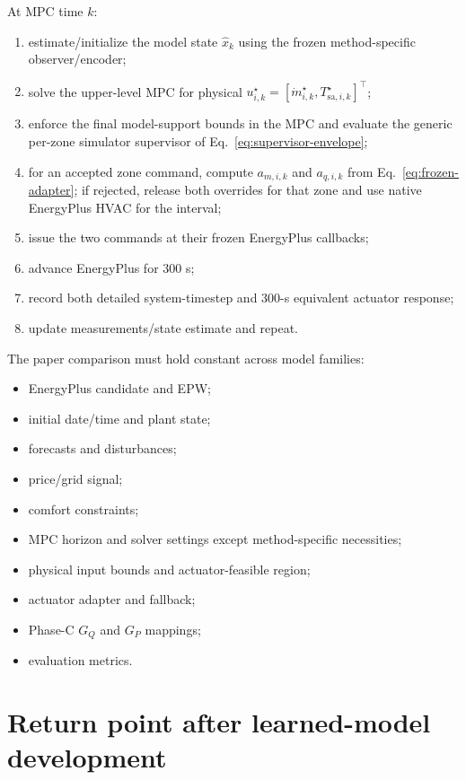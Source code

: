 \documentclass[11pt]{article}
\newcommand{\mdot}{\dot m}
\begin{document}
At MPC time $k$:
\begin{enumerate}[leftmargin=2em]
\item estimate/initialize the model state $\hat x_k$ using the frozen
method-specific observer/encoder;
\item solve the upper-level MPC for physical
$u_{i,k}^\star=[\mdot_{i,k}^\star,T_{\mathrm{sa},i,k}^\star]^\top$;
\item enforce the final model-support bounds in the MPC and evaluate the
generic per-zone simulator supervisor of Eq.~\eqref{eq:supervisor-envelope};
\item for an accepted zone command, compute $a_{m,i,k}$ and $a_{q,i,k}$ from
Eq.~\eqref{eq:frozen-adapter}; if rejected, release both overrides for that
zone and use native EnergyPlus HVAC for the interval;
\item issue the two commands at their frozen EnergyPlus callbacks;
\item advance EnergyPlus for 300 s;
\item record both detailed system-timestep and 300-s equivalent actuator
response;
\item update measurements/state estimate and repeat.
\end{enumerate}

The paper comparison must hold constant across model families:
\begin{itemize}[leftmargin=2em]
\item EnergyPlus candidate and EPW;
\item initial date/time and plant state;
\item forecasts and disturbances;
\item price/grid signal;
\item comfort constraints;
\item MPC horizon and solver settings except method-specific necessities;
\item physical input bounds and actuator-feasible region;
\item actuator adapter and fallback;
\item Phase-C $G_Q$ and $G_P$ mappings;
\item evaluation metrics.
\end{itemize}

\section{Return point after learned-model development}
\end{document}
